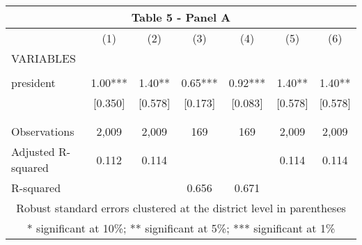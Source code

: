 \begin{tabular}{lcccccc}
\multicolumn{7}{c}{Table 5 - Panel A} \\ \hline
 & (1) & (2) & (3) & (4) & (5) & (6) \\
VARIABLES &  &  &  &  &  &  \\ \hline
 &  &  &  &  &  &  \\
president & 1.00*** & 1.40** & 0.65*** & 0.92*** & 1.40** & 1.40** \\
 & [0.350] & [0.578] & [0.173] & [0.083] & [0.578] & [0.578] \\
 &  &  &  &  &  &  \\
 &  &  &  &  &  &  \\
Observations & 2,009 & 2,009 & 169 & 169 & 2,009 & 2,009 \\
Adjusted R-squared & 0.112 & 0.114 &  &  & 0.114 & 0.114 \\
 R-squared &  &  & 0.656 & 0.671 &  &  \\ \hline
\multicolumn{7}{c}{ Robust standard errors clustered at the district level in parentheses} \\
\multicolumn{7}{c}{ * significant at 10\%; ** significant at 5\%; *** significant at 1\%} \\
\end{tabular}
